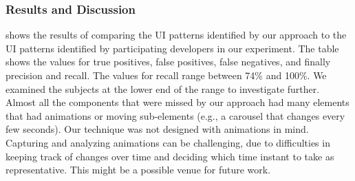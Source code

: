 \subsubsection{Results and Discussion}
 shows the results of comparing the UI patterns identified by our approach to the UI patterns identified by participating developers in our experiment.
The table shows the values for true positives, false positives, false negatives, and finally precision and recall. 
The values for recall range between 74\% and 100\%. We examined the subjects at the lower end of the range to investigate further.
Almost all the components that were missed by our approach had many elements that had animations or moving sub-elements (e.g., a carousel that changes every few seconds). 
Our technique was not designed with animations in mind.
Capturing and analyzing animations can be challenging, due to difficulties in keeping track of changes over time and deciding which time instant to take as representative. This might be a possible venue for future work.


